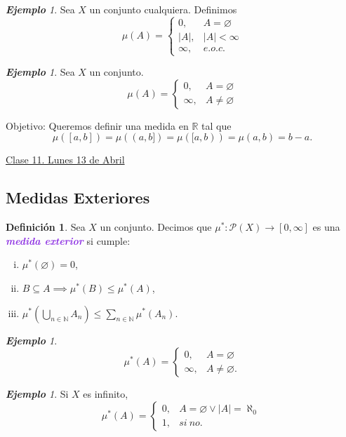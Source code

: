\documentclass{article}
\theoremstyle{definition}
\newtheorem{definition}[theorem]{Definición}
\theoremstyle{remark}
\newtheorem{example}[theorem]{\textbf{Ejemplo}}
\numberwithin{equation}{section}
\newcommand{\N}{\mathbb{N}}
\renewcommand{\P}{\mathcal{P}}
\newcommand{\R}{\mathbb{R}}
\newcommand{\oo}{\infty}
\newcommand{\abs}[1]{\left| #1 \right|}
\newcommand{\br}[1]{\left( #1 \right)}
\newcommand{\ds}{\displaystyle}
\newcommand{\wea}[1]{\textcolor{BlueViolet}{\textbf{\emph{#1}}}}
\newcommand{\fecha}[1]{\begin{flushright} \underline{#1} \end{flushright}}
\begin{document}
\begin{example}
  Sea $X$ un conjunto cualquiera. Definimos
  \[\mu(A) = \begin{cases}
    0, &A = \varnothing \\
    \abs A, &\abs A < \oo \\
    \oo, &e.o.c.
  \end{cases}\]
\end{example}

\begin{example}
  Sea $X$ un conjunto. 
  \[\mu(A) = \begin{cases}
    0, &A = \varnothing \\
    \oo, &A \neq \varnothing
  \end{cases}\]
\end{example}

Objetivo: Queremos definir una medida en $\R$ tal que $$\mu([a,b]) = \mu((a,b]) = \mu ([a,b)) = \mu(a,b) = b-a.$$

\newpage
\fecha{Clase 11. Lunes 13 de Abril}
\subsection{Medidas Exteriores}

\begin{definition}
  Sea $X$ un conjunto. Decimos que $\mu^* \colon \P(X) \to [0,\oo]$ es una \wea{medida exterior} si cumple:
  \begin{enumerate}[(i)]
    \item $\mu^*(\varnothing) = 0$,
    \item $B \subseteq A \implies \mu^*(B) \leq \mu^*(A)$,
    \item $\ds \mu^*\br{\bigcup_{n\in\N} A_n} \leq \sum_{n\in\N} \mu^*(A_n)$.
  \end{enumerate}
\end{definition}

\begin{example}
  \[\mu^*(A) = \begin{cases}
    0, &A = \varnothing \\
    \oo, &A \neq \varnothing.
  \end{cases}\]
\end{example}

\begin{example}
  Si $X$ es infinito,
  \[\mu^*(A) = \begin{cases}
    0, &A = \varnothing \lor \abs A = \aleph_0 \\
    1, &si \ no.
  \end{cases}\]
\end{example}
\end{document}
